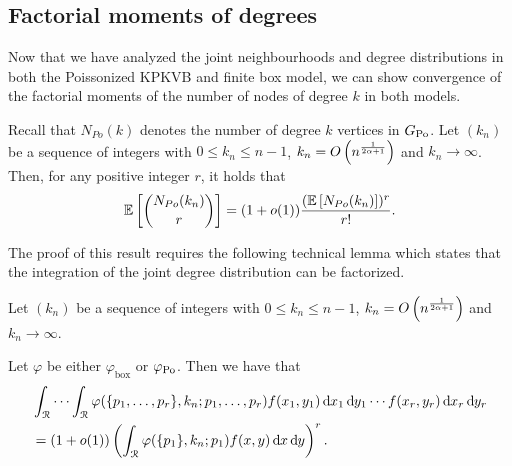 \subsection{Factorial moments of degrees}\label{ssec:factorial_moments_GPo}

Now that we have analyzed the joint neighbourhoods and degree distributions in both the Poissonized KPKVB and finite box model, we can show convergence of the factorial moments of the number of nodes of degree $k$ in both models.

\begin{lemma}\label{lem:factmoment}
Recall that $N_{Po}(k)$ denotes the number of degree $k$ vertices in $G_{{\mathrm{Po}}}$. Let $(k_n)$ be a sequence of integers with $0\leq k_n \leq n-1$, $k_n = O\left(n^{\frac{1}{2\alpha+1}}\right)$ and $k_n \rightarrow \infty$. Then, for any positive integer $r$, it holds that
\[
	\mathbb{E}\left[{N_{Po}(k_n) \choose r}\right] =(1+o(1)) \frac{(\mathbb{E}\left[ N_{Po}(k_n)\right])^r}{r!}.
\]
\end{lemma}

The proof of this result requires the following technical lemma which states that the integration of the joint degree distribution can be factorized.

\begin{lemma}
	\label{lem:asympind}
	Let $(k_n)$ be a sequence of integers with $0\leq k_n \leq n-1$, $k_n = O\left(n^{\frac{1}{2\alpha+1}}\right)$ and $k_n \rightarrow \infty$.
	
	Let $\varphi$ be either $\varphi_{\mathrm{box}}$ or $\varphi_{{\mathrm{Po}}}$. Then we have that
	\begin{align*}
	&\int_{{\mathcal R}} \cdots \int_{{\mathcal R}} \varphi(\{p_1,\dots,p_r \}, k_n ;p_1,\dots,p_r) 
		f(x_1,y_1) \operatorname{\mathrm{d}\hspace{-2pt}} x_1 \operatorname{\mathrm{d}\hspace{-2pt}} y_1 \cdots f(x_r,y_r)\operatorname{\mathrm{d}\hspace{-2pt}} x_r \operatorname{\mathrm{d}\hspace{-2pt}} y_r \\
	&= (1+o(1))\left(\int_{{\mathcal R}}  \varphi(\{p_1\}, k_n ;p_1) f(x,y) \operatorname{\mathrm{d}\hspace{-2pt}} x \operatorname{\mathrm{d}\hspace{-2pt}} y\right)^r .
	\end{align*}
\end{lemma}


